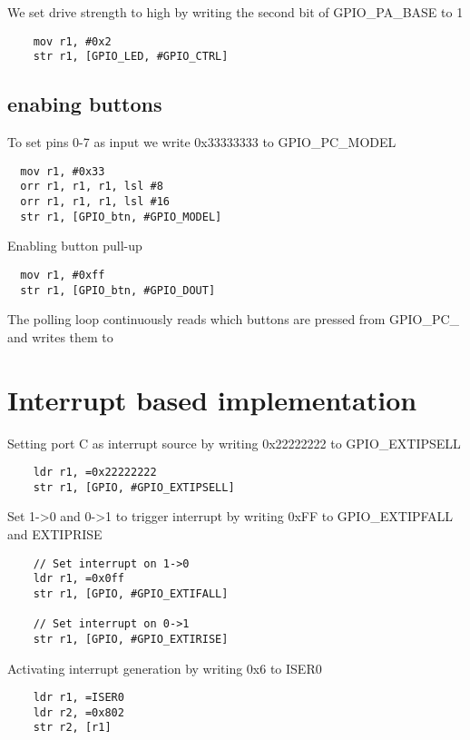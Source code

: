 We set drive strength to high by writing the second bit of GPIO\_PA\_BASE to 1

\begin{lstlisting}
	mov r1, #0x2
	str r1, [GPIO_LED, #GPIO_CTRL]
\end{lstlisting}

\subsection{enabing buttons}

To set pins 0-7 as input we write 0x33333333 to GPIO\_PC\_MODEL

\begin{lstlisting}
  mov r1, #0x33
  orr r1, r1, r1, lsl #8
  orr r1, r1, r1, lsl #16
  str r1, [GPIO_btn, #GPIO_MODEL]
\end{lstlisting}

Enabling button pull-up

\begin{lstlisting}
  mov r1, #0xff
  str r1, [GPIO_btn, #GPIO_DOUT]
\end{lstlisting}

The polling loop continuously reads which buttons are pressed from GPIO\_PC\_ and writes them to 

\section{Interrupt based implementation}

Setting port C as interrupt source by writing 0x22222222 to GPIO\_EXTIPSELL

\begin{lstlisting}
	ldr r1, =0x22222222
	str r1, [GPIO, #GPIO_EXTIPSELL]
\end{lstlisting}

Set 1->0 and 0->1 to trigger interrupt by writing 0xFF to GPIO\_EXTIPFALL and EXTIPRISE

\begin{lstlisting}
	// Set interrupt on 1->0
	ldr r1, =0x0ff
	str r1, [GPIO, #GPIO_EXTIFALL]

	// Set interrupt on 0->1
	str r1, [GPIO, #GPIO_EXTIRISE]
\end{lstlisting}

Activating interrupt generation by writing 0x6 to ISER0

\begin{lstlisting}
	ldr r1, =ISER0
	ldr r2, =0x802
	str r2, [r1]
\end{lstlisting}

